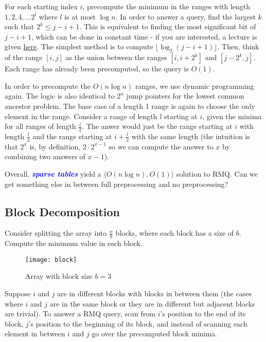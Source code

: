 \documentclass[11pt, oneside]{article}
\newcommand{\emphasis}[1]{\textcolor{blue}{\textbf{\textit{#1}}}}
\begin{document}
For each starting index \( i \), precompute the minimum in the ranges with length
\( 1, 2, 4, \dots 2^l \) where \( l \) is at most \( \log n \). In order to answer a query,
find the largest \( k \) such that \( 2^k \leq j - i + 1 \). This is equivalent to finding the
most significant bit of \( j - i + 1 \), which can be done in constant time - if you are interested,
a lecture is given \href{http://web.stanford.edu/class/cs166/lectures/16/Slides16.pdf}{here}.
The simplest method is to compute \( \lfloor \log_2{(j - i + 1)} \rfloor \). Then, think of the range
\( [i, j] \) as the union between the ranges \( [i, i + 2^k] \) and \( [j - 2^k, j] \).
Each range has already been precomputed, so the query is \( O(1) \).

In order to precompute the \( O(n \log n) \) ranges, we use dynamic programming again.
The logic is also identical to \( 2^n \) jump pointers for the lowest common ancestor problem.
The base case of a length 1 range is again to choose the only element in the range. Consider a range of length \( l \) starting
at \( i \), given the minima for all ranges of length \( \frac{l}{2} \). The anwer would just be
the range starting at \( i \) with length \( \frac{l}{2} \) and the range starting at \( i + \frac{l}{2} \)
with the same length (the intuition is that \( 2^x \) is, by definition, \( 2 \cdot 2^{x - 1} \) so we can compute the answer to \( x \)
by combining two answers of \( x - 1 \)).

Overall, \emphasis{sparse tables} yield a \( \langle O(n \log n), O(1) \rangle \) solution to RMQ.
Can we get something else in between full preprocessing and no preprocessing?

\subsection{Block Decomposition}

Consider splitting the array into \( \frac{n}{b} \) blocks, where each block
has a size of \( b \). Compute the minimum value in each block.

\begin{figure}[h!]
\centering
\texttt{[image: block]}
\caption{Array with block size \( b = 3 \)}
\end{figure}

Suppose \( i \) and \( j \) are in different blocks with blocks in between them
(the cases where \( i \) and \( j \) are in the same block or they are in different but adjacent blocks
are trivial). To answer a RMQ query, scan from \( i \)'s position to the end of its block,
\( j \)'s position to the beginning of its block, and instead of scanning each element in between
\( i \) and \( j \) go over the precomputed block minima.
\end{document}
